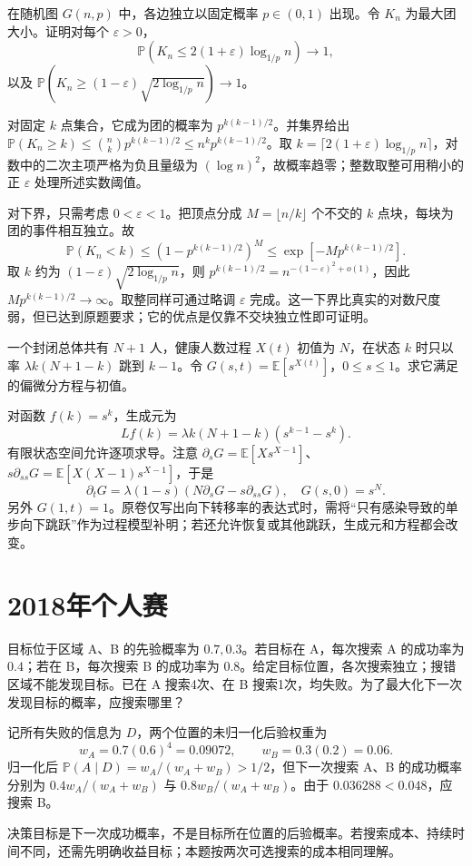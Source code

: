 \documentclass[UTF8,12pt,a4paper,fontset=fandol]{ctexbook}
\newcommand{\E}{\mathbb E}
\newcommand{\PP}{\mathbb P}
\begin{document}
\begin{example}[原题4：随机图最大团的粗上下界]\label{yau:2017-4}
在随机图 $G(n,p)$ 中，各边独立以固定概率 $p\in(0,1)$ 出现。令 $K_n$ 为最大团大小。证明对每个 $\varepsilon>0$，
\[
\PP(K_n\le2(1+\varepsilon)\log_{1/p}n)\to1,
\]
以及 $\PP(K_n\ge(1-\varepsilon)\sqrt{2\log_{1/p}n})\to1$。
\end{example}
\begin{solve}
对固定 $k$ 点集合，它成为团的概率为 $p^{k(k-1)/2}$。并集界给出 $\PP(K_n\ge k)\le\binom nk p^{k(k-1)/2}\le n^kp^{k(k-1)/2}$。取 $k=\lceil2(1+\varepsilon)\log_{1/p}n\rceil$，对数中的二次主项严格为负且量级为 $(\log n)^2$，故概率趋零；整数取整可用稍小的正 $\varepsilon$ 处理所述实数阈值。

对下界，只需考虑 $0<\varepsilon<1$。把顶点分成 $M=\lfloor n/k\rfloor$ 个不交的 $k$ 点块，每块为团的事件相互独立。故
\[
\PP(K_n<k)\le(1-p^{k(k-1)/2})^M\le\exp[-Mp^{k(k-1)/2}].
\]
取 $k$ 约为 $(1-\varepsilon)\sqrt{2\log_{1/p}n}$，则 $p^{k(k-1)/2}=n^{-(1-\varepsilon)^2+o(1)}$，因此 $Mp^{k(k-1)/2}\to\infty$。取整同样可通过略调 $\varepsilon$ 完成。这一下界比真实的对数尺度弱，但已达到原题要求；它的优点是仅靠不交块独立性即可证明。
\end{solve}

\begin{example}[原题5：纯死亡过程的概率生成函数]\label{yau:2017-5}
一个封闭总体共有 $N+1$ 人，健康人数过程 $X(t)$ 初值为 $N$，在状态 $k$ 时只以率 $\lambda k(N+1-k)$ 跳到 $k-1$。令 $G(s,t)=\E[s^{X(t)}]$，$0\le s\le1$。求它满足的偏微分方程与初值。
\end{example}
\begin{solve}
对函数 $f(k)=s^k$，生成元为
\[
Lf(k)=\lambda k(N+1-k)(s^{k-1}-s^k).
\]
有限状态空间允许逐项求导。注意 $\partial_sG=\E[Xs^{X-1}]$、$s\partial_{ss}G=\E[X(X-1)s^{X-1}]$，于是
\[
\partial_tG=\lambda(1-s)\left(N\partial_sG-s\partial_{ss}G\right),\quad G(s,0)=s^N.
\]
另外 $G(1,t)=1$。原卷仅写出向下转移率的表达式时，需将“只有感染导致的单步向下跳跃”作为过程模型补明；若还允许恢复或其他跳跃，生成元和方程都会改变。
\end{solve}

\section{2018年个人赛}
\begin{example}[原题1：搜索失败后的最优下一步]\label{yau:2018-1}
目标位于区域 A、B 的先验概率为 $0.7,0.3$。若目标在 A，每次搜索 A 的成功率为 $0.4$；若在 B，每次搜索 B 的成功率为 $0.8$。给定目标位置，各次搜索独立；搜错区域不能发现目标。已在 A 搜索4次、在 B 搜索1次，均失败。为了最大化下一次发现目标的概率，应搜索哪里？
\end{example}
\begin{solve}
记所有失败的信息为 $D$，两个位置的未归一化后验权重为
\[
w_A=0.7(0.6)^4=0.09072,\qquad w_B=0.3(0.2)=0.06.
\]
归一化后 $\PP(A\mid D)=w_A/(w_A+w_B)>1/2$，但下一次搜索 A、B 的成功概率分别为 $0.4w_A/(w_A+w_B)$ 与 $0.8w_B/(w_A+w_B)$。由于 $0.036288<0.048$，应搜索 B。

决策目标是下一次成功概率，不是目标所在位置的后验概率。若搜索成本、持续时间不同，还需先明确收益目标；本题按两次可选搜索的成本相同理解。
\end{solve}
\end{document}
